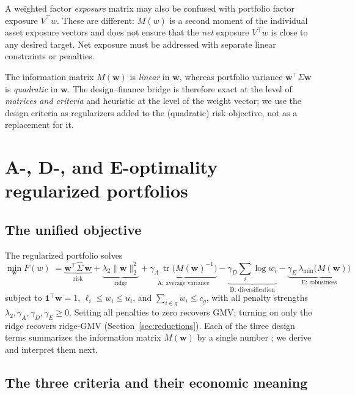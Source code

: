 \documentclass[11pt]{article}
\newcommand{\Sig}{\Sigma}
\newcommand{\Sighat}{\hat\Sigma}
\newcommand{\tr}{\operatorname{tr}}
\newcommand{\one}{\mathbf{1}}
\newcommand{\w}{\mathbf{w}}
\newcommand{\M}{M(\w)}
\newcommand{\lammin}{\lambda_{\min}}
\begin{document}
A weighted factor \emph{exposure} matrix may also be confused with portfolio factor exposure $V^\top w$. These are different: $M(w)$ is a second moment of the individual asset exposure vectors and does not ensure that the \emph{net} exposure $V^\top w$ is close to any desired target. Net exposure must be addressed with separate linear constraints or penalties.

The information matrix $\M$ is \emph{linear} in $\w$, whereas portfolio
variance $\w^\top\Sig\w$ is \emph{quadratic} in $\w$. The design--finance bridge
is therefore exact at the level of \emph{matrices and criteria} and heuristic at
the level of the weight vector; we use the design criteria as regularizers added
to the (quadratic) risk objective, not as a replacement for it.

\section{A-, D-, and E-optimality regularized portfolios}
\subsection{The unified objective}
The regularized portfolio solves
\begin{equation}
  \min_{\w} F(w) \; = 
  \underbrace{\w^\top\Sighat\,\w}_{\text{risk}}
  +\underbrace{\lambda_2\lVert\w\rVert_2^2}_{\text{ridge}}
  +\underbrace{\gamma_A\,\tr\!\big(\M^{-1}\big)}_{\text{A: average variance}}
  -\underbrace{\gamma_D\textstyle\sum_i\log w_i}_{\text{D: diversification}}
  -\underbrace{\gamma_E\,\lammin\!\big(\M\big)}_{\text{E: robustness}}
  \label{eq:objective}
\end{equation}
subject to $\one^\top\w=1$, $\ell_i\le w_i\le u_i$, and $\sum_{i\in g}w_i\le c_g$,
with all penalty strengths $\lambda_2,\gamma_A,\gamma_D,\gamma_E\ge0$. Setting all
penalties to zero recovers GMV; turning on only the ridge recovers ridge-GMV
(Section~\ref{sec:reductions}). Each of the three design terms summarizes the
information matrix $\M$ by a single number \cite{bergerwong}; we derive and
interpret them next.

\subsection{The three criteria and their economic meaning}
\end{document}
